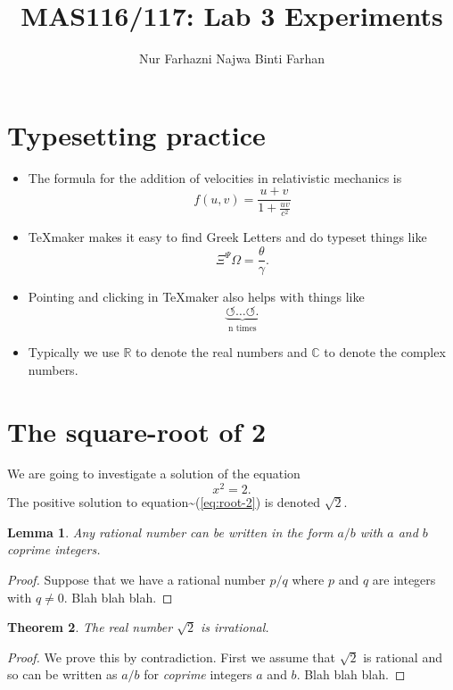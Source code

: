 \documentclass[11pt, a4paper]{amsart}
\title{MAS116/117: Lab 3 Experiments}
\author{Nur Farhazni Najwa Binti Farhan}
\newtheorem{thm}{Theorem}[section]
\newtheorem{lem}[thm]{Lemma}
\begin{document}
\maketitle
\section{Typesetting practice}
\begin{itemize}
    \item The formula for the addition of velocities in relativistic mechanics is 
   \[
   f(u, v) = \frac{u + v}{1 + \frac{uv}{c^2}}
   \]
    \item TeXmaker makes it easy to find Greek Letters and do typeset things like 
   \[
   \Xi^\Psi\Omega = \frac{\theta}{\gamma}.
   \]
   \item Pointing and clicking in TeXmaker also helps with things like  
   \[
   \underbrace{\circlearrowleft \ldots\circlearrowleft.} _ \text{n times}
   \]
   \item Typically we use $\mathbb{R}$ to denote the real numbers and $\mathbb{C}$ to denote the complex numbers.
\end{itemize}

\section{The square-root of 2}
We are going to investigate a solution of the equation
\begin{equation}
	x^2 = 2.
\label{eq:root-2} 
\end{equation}
The positive solution to equation\textasciitilde (\ref{eq:root-2}) is denoted $\sqrt{2}$. 

\begin{lem}
	Any rational number can be written in the form $a/b$ with $a$ and $b$ coprime integers.
\end{lem}
\begin{proof}
	Suppose that we have a rational number $p/q$ where $p$ and $q$ are integers with $q \neq 0$. Blah blah blah.
\end{proof}
\begin{thm}
	The real number $\sqrt{2}$ is irrational.
\end{thm}
\begin{proof}
	We prove this by contradiction. First we assume that $\sqrt{2}$ is rational and so can be written as $a/b$ for \emph{coprime} integers $a$ and $b$. Blah blah blah. 
\end{proof}
\end{document}
